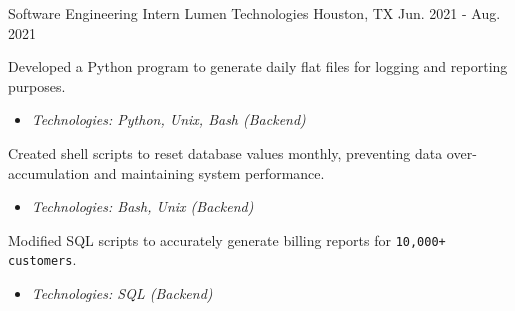 \begin{cventries}
  \cventry
    {Software Engineering Intern} %
    {Lumen Technologies} %
    {Houston, TX} %
    {Jun. 2021 - Aug. 2021} %
    {
      \begin{cvitems} %
      \item {Developed a Python program to generate daily flat files for logging and reporting purposes.
      \begin{itemize}
      \item \textit{Technologies: Python, Unix, Bash (Backend)}
      \end{itemize}
      }
      \item{Created shell scripts to reset database values monthly, preventing data over-accumulation and maintaining system performance.
      \begin{itemize}
      \item \textit{Technologies: Bash, Unix (Backend)}
      \end{itemize}
      }
      \item {Modified SQL scripts to accurately generate billing reports for \texttt{10,000+ customers}.
      \begin{itemize}
      \item \textit{Technologies: SQL (Backend)}
      \end{itemize}
      }
      \end{cvitems}
    }
\end{cventries}

    


